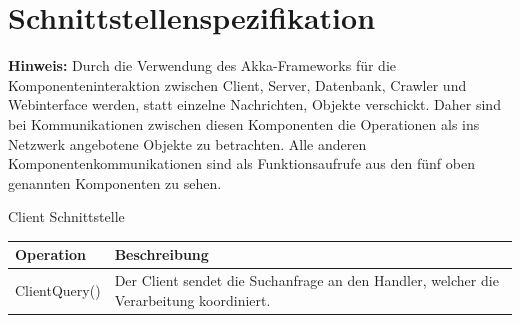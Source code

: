\section{Schnittstellenspezifikation}


\textbf{Hinweis:}
Durch die Verwendung des Akka-Frameworks für die Komponenteninteraktion zwischen
Client, Server, Datenbank, Crawler und Webinterface werden, statt einzelne
Nachrichten, Objekte verschickt.
Daher sind bei Kommunikationen zwischen diesen Komponenten die Operationen als
ins Netzwerk angebotene Objekte zu betrachten.
Alle anderen Komponentenkommunikationen sind als Funktionsaufrufe aus den fünf
oben genannten Komponenten zu sehen.

\begin{interface}{10}{Client Schnittstelle}
\begin{tabular}[ht]{|p{5cm}|p{9cm}|}
\hline
Operation & Beschreibung\\
\hline
ClientQuery()  & Der Client sendet die Suchanfrage an den Handler,
welcher die Verarbeitung koordiniert.\\
\hline
\end{tabular}
\end{interface}

